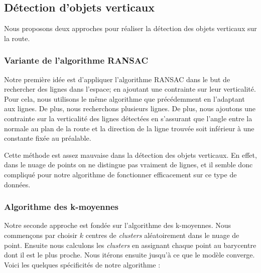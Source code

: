 \documentclass[titlepage,11pt,a4paper]{article}
\begin{document}
\subsection{Détection d'objets verticaux}
\par Nous proposons deux approches pour réaliser la détection des objets verticaux sur la route.

\subsubsection{Variante de l'algorithme RANSAC}
\par Notre première idée est d'appliquer l'algorithme RANSAC dans le but de rechercher des lignes dans l'espace; en ajoutant une contrainte sur leur verticalité. Pour cela, nous utilisons le même algorithme que précédemment en l'adaptant aux lignes. De plus, nous recherchons plusieurs lignes. De plus, nous ajoutons une contrainte sur la verticalité des lignes détectées en s'assurant que l'angle entre la normale au plan de la route et la direction de la ligne trouvée soit inférieur à une constante fixée au préalable.

\par Cette méthode est assez mauvaise dans la détection des objets verticaux. En effet, dans le nuage de points on ne distingue pas vraiment de lignes, et il semble donc compliqué pour notre algorithme de fonctionner efficacement sur ce type de données.

\subsubsection{Algorithme des k-moyennes}
\par Notre seconde approche est fondée sur l'algorithme des k-moyennes. Nous commençons par choisir $k$ centres de \emph{clusters} aléatoirement dans le nuage de point. Ensuite nous calculons les \emph{clusters} en assignant chaque point au barycentre dont il est le plus proche. Nous itérons ensuite jusqu'à ce que le modèle converge. Voici les quelques spécificités de notre algorithme :
\end{document}
